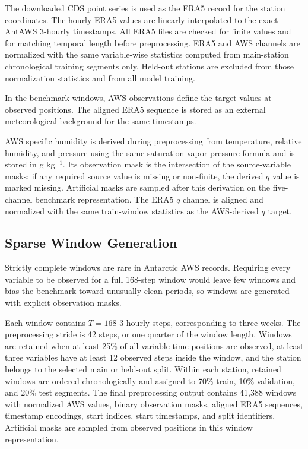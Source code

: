 The downloaded CDS point series is used as the ERA5 record for the station coordinates. The hourly ERA5 values are linearly interpolated to the exact AntAWS 3-hourly timestamps. All ERA5 files are checked for finite values and for matching temporal length before preprocessing. ERA5 and AWS channels are normalized with the same variable-wise statistics computed from main-station chronological training segments only. Held-out stations are excluded from those normalization statistics and from all model training.

In the benchmark windows, AWS observations define the target values at observed positions. The aligned ERA5 sequence is stored as an external meteorological background for the same timestamps.

AWS specific humidity is derived during preprocessing from temperature, relative humidity, and pressure using the same saturation-vapor-pressure formula and is stored in g kg$^{-1}$. Its observation mask is the intersection of the source-variable masks: if any required source value is missing or non-finite, the derived $q$ value is marked missing. Artificial masks are sampled after this derivation on the five-channel benchmark representation. The ERA5 $q$ channel is aligned and normalized with the same train-window statistics as the AWS-derived $q$ target.

\subsection{Sparse Window Generation}
Strictly complete windows are rare in Antarctic AWS records. Requiring every variable to be observed for a full 168-step window would leave few windows and bias the benchmark toward unusually clean periods, so windows are generated with explicit observation masks.

Each window contains $T=168$ 3-hourly steps, corresponding to three weeks. The preprocessing stride is 42 steps, or one quarter of the window length. Windows are retained when at least 25\% of all variable-time positions are observed, at least three variables have at least 12 observed steps inside the window, and the station belongs to the selected main or held-out split. Within each station, retained windows are ordered chronologically and assigned to 70\% train, 10\% validation, and 20\% test segments. The final preprocessing output contains 41,388 windows with normalized AWS values, binary observation masks, aligned ERA5 sequences, timestamp encodings, start indices, start timestamps, and split identifiers. Artificial masks are sampled from observed positions in this window representation.

